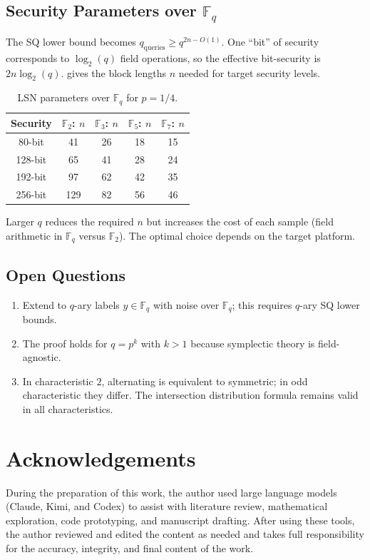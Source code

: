 \documentclass[11pt,a4paper]{article}
\theoremstyle{plain}
\theoremstyle{definition}
\newcommand{\F}{\mathbb{F}}
\begin{document}
\subsection{Security Parameters over $\F_q$}
\label{subsec:fq-params}

The SQ lower bound becomes $q_{\mathrm{queries}} \geq q^{2n-O(1)}$. One ``bit'' of security corresponds to $\log_2(q)$ field operations, so the effective bit-security is $2n \log_2(q)$.  gives the block lengths $n$ needed for target security levels.

\begin{table}[ht]
\centering
\caption{LSN parameters over $\F_q$ for $p=1/4$.}
\label{tab:fq-params}
\begin{tabular}{@{}ccccc@{}}
\hline
Security & $\F_2$: $n$ & $\F_3$: $n$ & $\F_5$: $n$ & $\F_7$: $n$ \\
\hline
80-bit  & 41  & 26 & 18 & 15 \\
128-bit & 65  & 41 & 28 & 24 \\
192-bit & 97  & 62 & 42 & 35 \\
256-bit & 129 & 82 & 56 & 46 \\
\hline
\end{tabular}
\end{table}

Larger $q$ reduces the required $n$ but increases the cost of each sample (field arithmetic in $\F_q$ versus $\F_2$). The optimal choice depends on the target platform.

\subsection{Open Questions}
\label{subsec:fq-open}

\begin{enumerate}
\item Extend to $q$-ary labels $y \in \F_q$ with noise over $\F_q$; this requires $q$-ary SQ lower bounds.
\item The proof holds for $q = p^k$ with $k > 1$ because symplectic theory is field-agnostic.
\item In characteristic $2$, alternating is equivalent to symmetric; in odd characteristic they differ. The intersection distribution formula remains valid in all characteristics.
\end{enumerate}


\section*{Acknowledgements}
During the preparation of this work, the author used large language models (Claude, Kimi, and Codex) to assist with literature review, mathematical exploration, code prototyping, and manuscript drafting. After using these tools, the author reviewed and edited the content as needed and takes full responsibility for the accuracy, integrity, and final content of the work.
\end{document}
